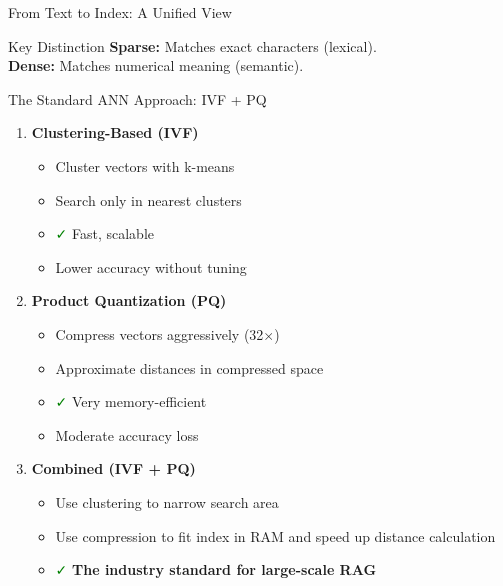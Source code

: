 \documentclass[aspectratio=169]{beamer}
\begin{document}
\begin{frame}{From Text to Index: A Unified View}
\begin{center}

\end{center}

\vspace{1em}
\begin{exampleblock}{Key Distinction}
\textbf{Sparse:} Matches exact characters (lexical). \\
\textbf{Dense:} Matches numerical meaning (semantic).
\end{exampleblock}
\end{frame}

\begin{frame}[shrink=5]{The Standard ANN Approach: IVF + PQ}
\begin{enumerate}
    \item \textbf{Clustering-Based (IVF)}
    \begin{itemize}
        \item Cluster vectors with k-means
        \item Search only in nearest clusters
        \item \textcolor{green}{\faCheck } Fast, scalable
        \item \textcolor{red}{\faTimes } Lower accuracy without tuning
    \end{itemize}
    
    \item \textbf{Product Quantization (PQ)}
    \begin{itemize}
        \item Compress vectors aggressively (32$\times$)
        \item Approximate distances in compressed space
        \item \textcolor{green}{\faCheck } Very memory-efficient
        \item \textcolor{red}{\faTimes } Moderate accuracy loss
    \end{itemize}
    
    \item \textbf{Combined (IVF + PQ)}
    \begin{itemize}
        \item Use clustering to narrow search area
        \item Use compression to fit index in RAM and speed up distance calculation
        \item \textcolor{green}{\faCheck } \textbf{The industry standard for large-scale RAG}
    \end{itemize}
\end{enumerate}
\end{frame}
\end{document}
